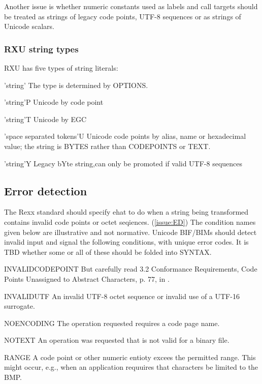 \documentclass[b4paper]{article}
\begin{document}
Another issue is whether numeric constants used as labels and call
targets should be treated as strings of legacy code points, UTF-8
sequences or as strings of Unicode scalars.

\subsubsection{RXU string types}

RXU has five types of string literals\cite{RXU:NewTypes}:
\begin{definition}
\item['string'] The type is determined by OPTIONS.
\item['string'P] Unicode by code point
\item['string'T] Unicode by EGC
\item['space separated tokens'U]
Unicode code points by alias, name or hexadecimal value;
the string is BYTES rather than CODEPOINTS or TEXT.
\item['string'Y] Legacy bYte string,can only be promoted if valid UTF-8 sequences
\end{definition}

\subsection{Error detection}
The Rexx standard should specify ehat to do when a string being transformed
contains invalid code points or octet seqiences. (\cref{issue:ED})
The condition names given below are illustrative and not normative.
Unicode BIF/BIMs should detect invalid input and signal the following conditions, with unique error codes.
It is TBD whether some or all of these should be folded into SYNTAX.

\begin{definition}
\item [INVALIDCODEPOINT]%
But carefully read 3.2 Conformance Requirements,
Code Points Unassigned to Abstract Characters, p. 77, in \cite{Unicode}.
\item[INVALIDUTF]%
An invalid UTF-8 octet sequence or invalid use of a UTF-16 surrogate.
\item [NOENCODING]%
The operation requested requires a code page name.
\item [NOTEXT]%
An operation was requested that is not valid for a binary file.
\item [RANGE]%
A code point or other numeric entioty excees the permitted range.
This might occur, e.g., when an application requuires that characters be limited to the BMP.
\end{definition}
\end{document}
